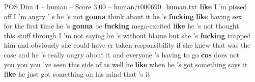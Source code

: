 \begin{textsample}{POS Dim 4 – human – Score 3.00 – human/t000690\_human.txt}  \label{ex:f4_pos_013}
\textbf{like} I 'm pissed off I 'm angry ' s he 's not \textbf{gonna} think about it he 's \textbf{fucking} \textbf{like} having sex for the first time he 's \textbf{gonna} be \textbf{fucking} mega-excited \textbf{like} he 's not thought this stuff through I 'm not saying he 's without blame but she 's \textbf{fucking} trapped him and obviously she could have er taken responsibility if she knew that was the case and he 's really angry about it and everyone 's having to go \textbf{cos} does not you you you 've seen this side of as well he \textbf{like} when he 's got something says it \textbf{like} he just got something on his mind that 's it

\end{textsample}
